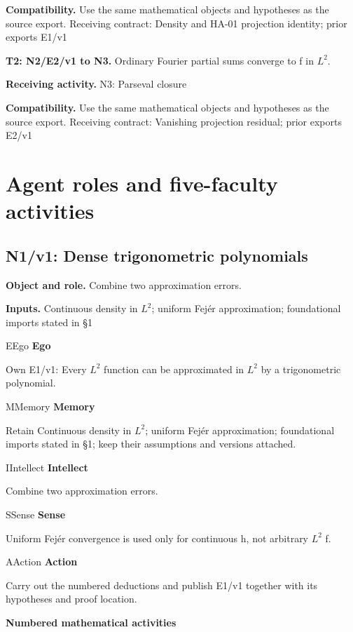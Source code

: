 \documentclass[preprint,12pt,aps,pra,showkeys,amsmath,amssymb,superscriptaddress,floatfix]{revtex4-2}
\theoremstyle{definition}
\theoremstyle{remark}
\newcommand{\mmfaculty}[3]{%
 \begin{mmfacultybox}{#1}{#2}
 {\sffamily\bfseries\color{MMBlue}#2}\par\smallskip #3
 \end{mmfacultybox}}
\newcommand{\field}[2]{\par\smallskip\noindent\textbf{#1.} #2\par}
\begin{document}
\field{Compatibility}{Use the same mathematical objects and hypotheses as the source export.
Receiving contract: Density and HA-01 projection identity; prior exports
E1/v1}

\field{T2: N2/E2/v1 to N3}{Ordinary Fourier partial sums converge to f in \(L^{2}\).}

\field{Receiving activity}{N3: Parseval closure}

\field{Compatibility}{Use the same mathematical objects and hypotheses as the source export.
Receiving contract: Vanishing projection residual; prior exports E2/v1}

\endgroup

\clearpage\section{Agent roles and five-faculty activities}\begingroup\small\linespread{1.05}\selectfont{}

\subsection{N1/v1: Dense trigonometric polynomials}

\field{Object and role}{Combine two approximation errors.}

\field{Inputs}{Continuous density in \(L^{2}\); uniform Fejér approximation;
foundational imports stated in §1}

\mmfaculty{E}{Ego}{Own E1/v1: Every \(L^{2}\) function can be approximated in \(L^{2}\) by
a trigonometric polynomial.}

\mmfaculty{M}{Memory}{Retain Continuous density in \(L^{2}\); uniform Fejér approximation;
foundational imports stated in §1; keep their assumptions and versions
attached.}

\mmfaculty{I}{Intellect}{Combine two approximation errors.}

\mmfaculty{S}{Sense}{Uniform Fejér convergence is used only for continuous h, not arbitrary
\(L^{2}\) f.}

\mmfaculty{A}{Action}{Carry out the numbered deductions and publish E1/v1 together with its
hypotheses and proof location.}

\smallskip\noindent\textbf{Numbered mathematical activities}
\end{document}
